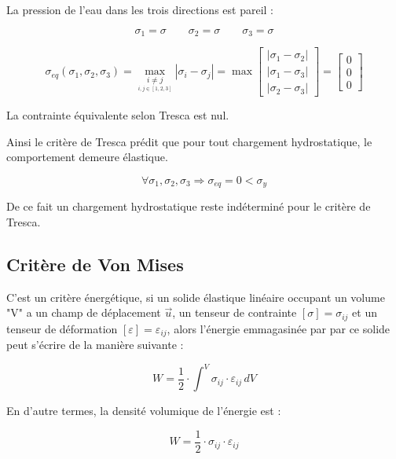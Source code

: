 \documentclass[12pt,a4paper]{report}
\begin{document}
	{\centering La pression de l'eau dans les trois directions est pareil : \par}
	
	\[ \sigma_{1} = \sigma \qquad \sigma_{2} = \sigma \qquad \sigma_{3} = \sigma \]
	
	\[ \sigma_{eq}(\sigma_{1},\sigma_{2},\sigma_{3}) = \underset{\underset{i,j \in [1,2,3]}{i\neq j}}{\max} |\sigma_{i} - \sigma_{j}| = 
	\max \begin{bmatrix}
		|\sigma_{1} - \sigma_{2}|\\
		|\sigma_{1} - \sigma_{3}|\\
		|\sigma_{2} - \sigma_{3}|
	\end{bmatrix} 
	= \begin{bmatrix}
		0\\
		0\\
		0
	\end{bmatrix}  \]
	
	
	\begin{tcolorbox}[colback=gray!20, colframe=black, title=Remarque]
		La contrainte équivalente selon Tresca est nul.
		
		Ainsi le critère de Tresca prédit que pour tout chargement hydrostatique, le comportement demeure élastique.
		
		\[ \forall \sigma_{1},\sigma_{2},\sigma_{3} \Rightarrow \sigma_{eq} = 0 < \sigma_{y} \]
		
		De ce fait un chargement hydrostatique reste indéterminé pour le critère de Tresca.
	\end{tcolorbox}
	
	
	
	
	
	
	
	\subsection{Critère de Von Mises}
	
	C'est un critère énergétique, si un solide élastique linéaire occupant un volume "V" a un champ de déplacement $\vec{u}$, un tenseur de contrainte $[\sigma] = \sigma_{ij}$ et un tenseur de déformation $[\varepsilon] = \varepsilon_{ij}$, alors l'énergie emmagasinée par  par ce solide peut s'écrire de la manière suivante :
	
	\[ W = \dfrac{1}{2} \cdot \int^{V} \sigma_{ij} \cdot \varepsilon_{ij} \, dV \]
	
	En d'autre termes, la densité volumique de l'énergie est :
	
	\[ W = \dfrac{1}{2} \cdot \sigma_{ij} \cdot \varepsilon_{ij} \]
	
\end{document}
